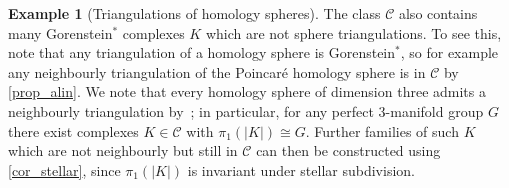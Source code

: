 \documentclass[a4paper,10pt]{amsart}
\theoremstyle{definition}
\newtheorem{example}[theorem]{Example}
\theoremstyle{remark}
\begin{document}
\begin{example}[Triangulations of homology spheres]
The class $\mathcal{C}$ also contains many Gorenstein$^*$ complexes $K$ which are not sphere triangulations. To see this, note that any triangulation of a homology sphere is Gorenstein$^*$, so for example any neighbourly triangulation of the Poincar\'e homology sphere is in $\mathcal{C}$ by \cref{prop_alin}. We note that every homology sphere of dimension three admits a neighbourly triangulation by~\cite[Corollary~5.15]{Sw}; in particular, for any perfect $3$-manifold group $G$ there exist complexes $K\in\mathcal{C}$ with $\pi_1(|K|)\cong G$. Further families of such $K$ which are not neighbourly but still in $\mathcal{C}$ can then be constructed using \cref{cor_stellar}, since $\pi_1(|K|)$ is invariant under stellar subdivision.
\end{example}
\end{document}
